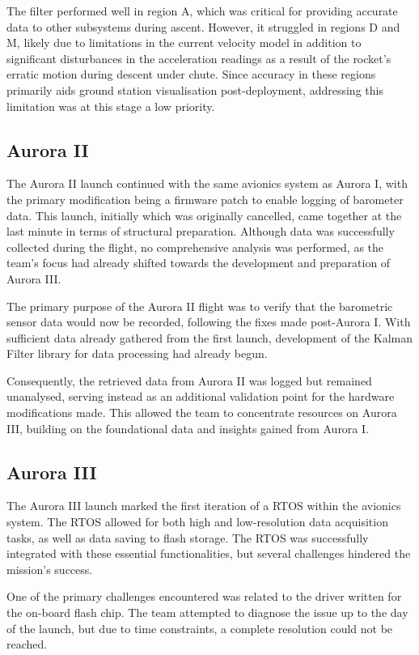 The filter performed well in region A, which was critical for providing accurate data to other subsystems during ascent. However, it struggled in regions D and M, likely due to limitations in the current velocity model in addition to significant disturbances in the acceleration readings as a result of the rocket's erratic motion during descent under chute. Since accuracy in these regions primarily aids ground station visualisation post-deployment, addressing this limitation was at this stage a low priority.

\subsection{Aurora II}
The Aurora II launch continued with the same avionics system as Aurora I, with the primary modification being a firmware patch to enable logging of barometer data. This launch, initially which was originally cancelled, came together at the last minute in terms of structural preparation. Although data was successfully collected during the flight, no comprehensive analysis was performed, as the team’s focus had already shifted towards the development and preparation of Aurora III. 

The primary purpose of the Aurora II flight was to verify that the barometric sensor data would now be recorded, following the fixes made post-Aurora I. With sufficient data already gathered from the first launch, development of the Kalman Filter library for data processing had already begun. 

Consequently, the retrieved data from Aurora II was logged but remained unanalysed, serving instead as an additional validation point for the hardware modifications made. This allowed the team to concentrate resources on Aurora III, building on the foundational data and insights gained from Aurora I.

\subsection{Aurora III}
The Aurora III launch marked the first iteration of a RTOS within the avionics system. The RTOS allowed for both high and low-resolution data acquisition tasks, as well as data saving to flash storage. The RTOS was successfully integrated with these essential functionalities, but several challenges hindered the mission's success. 

One of the primary challenges encountered was related to the driver written for the on-board flash chip. The team attempted to diagnose the issue up to the day of the launch, but due to time constraints, a complete resolution could not be reached. 

